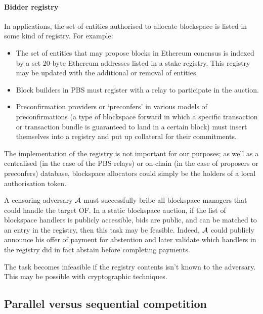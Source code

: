 \paragraph{Bidder registry}
In applications, the set of entities authorised to allocate blockspace is listed in some kind of registry.
%
For example:
\begin{itemize}
  \item 
    The set of entities that may propose blocks in Ethereum conensus is indexed by a set 20-byte Ethereum addresses listed in a stake registry. 
    This registry may be updated with the additional or removal of entities.

  \item
    Block builders in PBS must register with a relay to participate in the auction.

  \item
    Preconfirmation providers or `preconfers' in various models of preconfirmations (a type of blockspace forward in which a specific transaction or transaction bundle is guaranteed to land in a certain block) must insert themselves into a registry and put up collateral for their commitments.
\end{itemize}
%
The implementation of the registry is not important for our purposes; as well as a centralised (in the case of the PBS relays) or on-chain (in the case of proposers or preconfers) database, blockspace allocators could simply be the holders of a local authorisation token.

A censoring adversary $\mathcal{A}$ must successfully bribe all blockspace managers that could handle the target OF.
%
In a static blockspace auction, if the list of blockspace handlers is publicly accessible, bids are public, and can be matched to an entry in the registry, then this task may be feasible.
%
Indeed, $\mathcal{A}$ could publicly announce his offer of payment for abstention and later validate which handlers in the registry did in fact abstain before completing payments.

The task becomes infeasible if the registry contents isn't known to the adversary.
%
This may be possible with cryptographic techniques.

\subsection{Parallel versus sequential competition}

